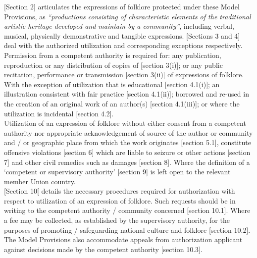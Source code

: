 \documentclass[11pt]{article}
\begin{document}
[Section 2]\cite{wipo85_model_provi_national_laws_folklore} articulates the
expressions of folklore protected under these Model Provisions, as
\emph{``productions consisting of characteristic elements of the traditional artistic
heritage developed and maintain by a community''}, including verbal, musical,
physically demonstrative and tangible expressions. [Sections 3 and
4]\cite{wipo85_model_provi_national_laws_folklore} deal with the authorized
utilization and corresponding exceptions respectively. Permission from a
competent authority is required for: any publication, reproduction or any
distribution of copies of [section
3(i)]\cite{wipo85_model_provi_national_laws_folklore}; or any public recitation,
performance or transmission [section
3(ii)]\cite{wipo85_model_provi_national_laws_folklore} of expressions of folklore.
With the exception of utilization that is educational [section
4.1(i)]\cite{wipo85_model_provi_national_laws_folklore}; an illustration
consistent with fair practice [section
4.1(ii)]\cite{wipo85_model_provi_national_laws_folklore}; borrowed and re-used in
the creation of an original work of an author(s) [section
4.1(iii)]\cite{wipo85_model_provi_national_laws_folklore}; or where the
utilization is incidental [section
4.2]\cite{wipo85_model_provi_national_laws_folklore}.\\

Utilization of an expression of folklore without either consent from a competent
authority nor appropriate acknowledgement of source of the author or community
and / or geographic place from which the work originates [section
5.1]\cite{wipo85_model_provi_national_laws_folklore}, constitute offensive
violations [section 6]\cite{wipo85_model_provi_national_laws_folklore} which are
liable to seizure or other actions [section
7]\cite{wipo85_model_provi_national_laws_folklore} and other civil remedies such
as damages [section 8]\cite{wipo85_model_provi_national_laws_folklore}. Where the
definition of a `competent or supervisory authority' [section
9]\cite{wipo85_model_provi_national_laws_folklore} is left open to the relevant
member Union country.\\

[Section 10[\cite{wipo85_model_provi_national_laws_folklore} details the necessary
procedures required for authorization with respect to utilization of an
expression of folklore. Such requests should be in writing to the competent
authority / community concerned [section
10.1]\cite{wipo85_model_provi_national_laws_folklore}. Where a fee may be
collected, as established by the supervisory authority, for the purposes of
promoting / safeguarding national culture and folklore [section
10.2]\cite{wipo85_model_provi_national_laws_folklore}. The Model Provisions also
accommodate appeals from authorization applicant against decisions made by the
competent authority [section
10.3]\cite{wipo85_model_provi_national_laws_folklore}.\\
\end{document}
